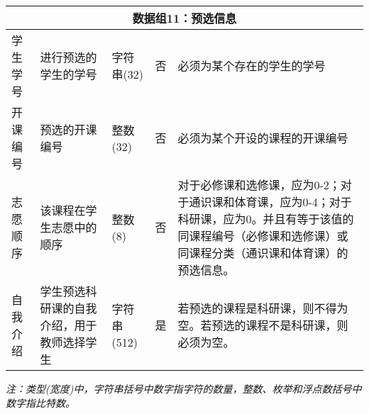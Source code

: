 \begin{center}
\begin{longtable}{p{6em}p{16em}p{8em}@{}p{2em}p{16em}}
        \multicolumn{5}{c}{\textbf{数据组11：预选信息}} \\
        \midrule
        学生学号 & 进行预选的学生的学号 & 字符串(32) & 否 & 必须为某个存在的学生的学号 \\
        开课编号 & 预选的开课编号 & 整数(32) & 否 & 必须为某个开设的课程的开课编号 \\
        志愿顺序 & 该课程在学生志愿中的顺序 & 整数(8) & 否 & 对于必修课和选修课，应为0-2；对于通识课和体育课，应为0-4；对于科研课，应为0。并且有等于该值的同课程编号（必修课和选修课）或同课程分类（通识课和体育课）的预选信息。\\
        自我介绍 & 学生预选科研课的自我介绍，用于教师选择学生 & 字符串(512) & 是 & 若预选的课程是科研课，则不得为空。若预选的课程不是科研课，则必须为空。 \\
    \end{longtable}
    \textit{注：类型(宽度)中，字符串括号中数字指字符的数量，整数、枚举和浮点数括号中数字指比特数。}
\end{center}
